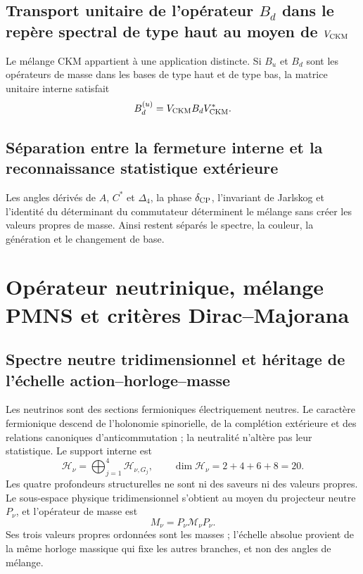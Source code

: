 \subsection{Transport unitaire de l'opérateur \texorpdfstring{\(B_d\)}{B_d} dans le repère spectral de type haut au moyen de \texorpdfstring{\(V_{\rm CKM}\)}{V_CKM}}

Le mélange CKM appartient à une application distincte. Si \(B_u\) et \(B_d\) sont les
opérateurs de masse dans les bases de type haut et de type bas, la matrice unitaire
interne satisfait
\[
 B_d^{(u)}=V_{\rm CKM} B_d V_{\rm CKM}^*.
\]

\subsection{Séparation entre la fermeture interne et la reconnaissance statistique extérieure}

Les angles dérivés de \(A\), \(C^*\) et \(\Delta_4\), la phase
\(\delta_{\rm CP}\), l'invariant de Jarlskog et l'identité du déterminant
du commutateur déterminent le mélange sans créer les valeurs propres de masse. Ainsi
restent séparés le spectre, la couleur, la génération et le changement de base.

\section{Opérateur neutrinique, mélange PMNS et critères Dirac--Majorana}

\subsection{Spectre neutre tridimensionnel et héritage de l'échelle action--horloge--masse}

Les neutrinos sont des sections fermioniques électriquement neutres. Le
caractère fermionique descend de l'holonomie spinorielle, de la complétion extérieure et
des relations canoniques d'anticommutation ; la neutralité n'altère pas leur
statistique. Le support interne est
\[
 \mathcal H_\nu=
 \bigoplus_{j=1}^{4}\mathcal H_{\nu,G_j},
 \qquad
 \dim\mathcal H_\nu=2+4+6+8=20.
\]
Les quatre profondeurs structurelles ne sont ni des saveurs ni des valeurs propres. Le
sous-espace physique tridimensionnel s'obtient au moyen du projecteur neutre
\(P_\nu\), et l'opérateur de masse est
\[
 M_\nu=P_\nu\mathcal M_\nu P_\nu.
\]
Ses trois valeurs propres ordonnées sont les masses ; l'échelle absolue provient de la
même horloge massique qui fixe les autres branches, et non des angles de mélange.

